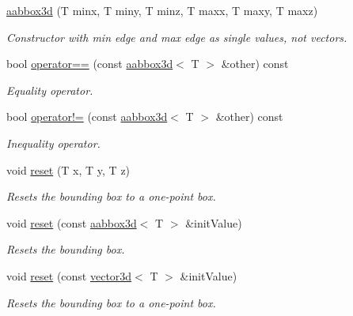 \begin{DoxyCompactItemize}
\mbox{\label{classirr_1_1core_1_1aabbox3d_af73ac9adeaae3abf8afaeb5f6be4a52c}} 
\hyperlink{classirr_1_1core_1_1aabbox3d_af73ac9adeaae3abf8afaeb5f6be4a52c}{aabbox3d} (T minx, T miny, T minz, T maxx, T maxy, T maxz)
\begin{DoxyCompactList}\small\item\em Constructor with min edge and max edge as single values, not vectors. \end{DoxyCompactList}\item 
bool \hyperlink{classirr_1_1core_1_1aabbox3d_ac77180d63cc1726d0dec25e6f4cfd59c}{operator==} (const \hyperlink{classirr_1_1core_1_1aabbox3d}{aabbox3d}$<$ T $>$ \&other) const
\begin{DoxyCompactList}\small\item\em Equality operator. \end{DoxyCompactList}\item 
bool \hyperlink{classirr_1_1core_1_1aabbox3d_a985eec4fb632d7c8ef5a5577209690b3}{operator!=} (const \hyperlink{classirr_1_1core_1_1aabbox3d}{aabbox3d}$<$ T $>$ \&other) const
\begin{DoxyCompactList}\small\item\em Inequality operator. \end{DoxyCompactList}\item 
void \hyperlink{classirr_1_1core_1_1aabbox3d_afc718e96ed11aa71a30311d32bfc885a}{reset} (T x, T y, T z)
\begin{DoxyCompactList}\small\item\em Resets the bounding box to a one-\/point box. \end{DoxyCompactList}\item 
void \hyperlink{classirr_1_1core_1_1aabbox3d_a5f7139087de60b4c16b5df015ade1cba}{reset} (const \hyperlink{classirr_1_1core_1_1aabbox3d}{aabbox3d}$<$ T $>$ \&init\+Value)
\begin{DoxyCompactList}\small\item\em Resets the bounding box. \end{DoxyCompactList}\item 
void \hyperlink{classirr_1_1core_1_1aabbox3d_af777a607745b2bd3f4390dfee8263944}{reset} (const \hyperlink{classirr_1_1core_1_1vector3d}{vector3d}$<$ T $>$ \&init\+Value)
\begin{DoxyCompactList}\small\item\em Resets the bounding box to a one-\/point box. \end{DoxyCompactList}\item 

\end{DoxyCompactItemize}
